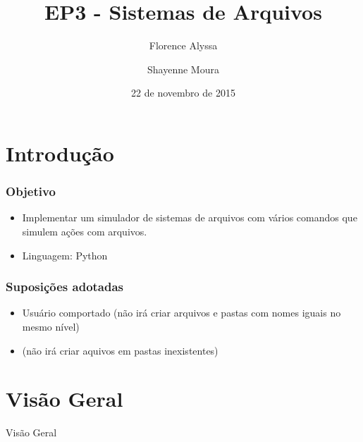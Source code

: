 \documentclass{beamer}
\title{EP3 - Sistemas de Arquivos} %
\author{Florence Alyssa \and Shayenne Moura} %
\institute[USP] %
{
Sistemas Operacionais
 \\ Bacharelado em Ciência da Computação%
\medskip
\textit{} %
}
\date{22 de novembro de 2015} %
\begin{document}
\begin{frame}
\titlepage %
\end{frame}


\section{Introdução} 
\begin{frame}
\frametitle{Objetivo}
\begin{itemize}
\item Implementar um simulador de sistemas de arquivos com vários comandos que simulem ações com arquivos.
\newline

\item Linguagem: Python
\end{itemize}

\end{frame}

\begin{frame}
\frametitle{Suposições adotadas}
\begin{itemize}
\item Usuário comportado (não irá criar arquivos e pastas com nomes iguais no mesmo nível)
\item                    (não irá criar aquivos em pastas inexistentes)
\end{itemize}
\end{frame}

\section{Visão Geral} 
\begin{frame}
\begin{LARGE}
\begin{center}
Visão Geral
\end{center}
\end{LARGE}
\end{frame}

\end{document}
